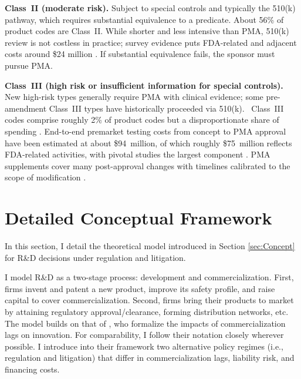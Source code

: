 \documentclass[letterpaper,12pt]{article}
\theoremstyle{definition}
\begin{document}
\textbf{Class~II (moderate risk).} Subject to special controls and typically the 510(k) pathway, which requires substantial equivalence to a predicate. About 56\% of product codes are Class~II. While shorter and less intensive than PMA, 510(k) review is not costless in practice; survey evidence puts FDA-related and adjacent costs around \$24 million \citep{Makower:2010}. If substantial equivalence fails, the sponsor must pursue PMA.



\textbf{Class~III (high risk or insufficient information for special controls).} New high-risk types generally require PMA with clinical evidence; some pre-amendment Class~III types have historically proceeded via 510(k).\footnotemark 
{}~Class~III codes comprise roughly 2\% of product codes but a disproportionate share of spending \citep{Meier09}. End-to-end premarket testing costs from concept to PMA approval have been estimated at about \$94~million, of which roughly \$75~million reflects FDA-related activities, with pivotal studies the largest component \citep{Makower:2010}. PMA supplements cover many post-approval changes with timelines calibrated to the scope of modification \citep{johnson2012fda}.




 \section{Detailed Conceptual Framework}\label{sec:AppendixConcept}

 In this section, I detail the theoretical model introduced in Section \ref{sec:Concept} for R\&D decisions under regulation and litigation.

I model R\&D as a two-stage process: development and commercialization. First, firms invent and patent a new product, improve its safety profile, and raise capital to cover commercialization. Second, firms bring their products to market by attaining regulatory approval/clearance, forming distribution networks, etc. The model builds on that of \citet{budish2015firms}, who formalize the impacts of commercialization lags on innovation. For comparability, I follow their notation closely wherever possible. I introduce into their framework two alternative policy regimes (i.e., regulation and litigation) that differ in commercialization lags, liability risk, and financing costs.
\end{document}
